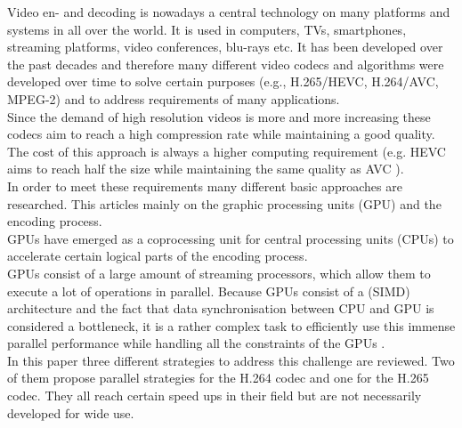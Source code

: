 Video en- and decoding is nowadays a central technology on many platforms and systems in all over the world. It is used in computers, TVs, smartphones, streaming platforms, video conferences, blu-rays etc.
It has been developed over the past decades and therefore many different video codecs and algorithms were developed over time to solve certain purposes (e.g., H.265/HEVC, H.264/AVC, MPEG-2) and to address requirements of many applications.\\
Since the demand of high resolution videos is more and more increasing these codecs aim to reach a high compression rate while maintaining a good quality. The cost of this approach is always a higher computing requirement 
(e.g. HEVC aims to reach half the size while maintaining the same quality as AVC ).\\
In order to meet these requirements many different basic approaches are researched. This articles mainly  on the graphic processing units (GPU) and the encoding process.\\
GPUs have emerged as a coprocessing unit for central processing units (CPUs) to accelerate certain logical parts of the encoding process.\\
GPUs consist of a large amount of streaming processors, which allow them to execute a lot of operations in parallel. Because GPUs consist of a  (SIMD) architecture  and the fact that data synchronisation between CPU and GPU is considered a bottleneck, it is a rather complex task to efficiently use this immense parallel performance while handling all the constraints of the GPUs .\\
In this paper three different strategies to address this challenge are reviewed. Two of them propose parallel strategies for the H.264 codec and one for the H.265 codec. They all reach certain speed ups in their field but are not necessarily developed for wide use.
